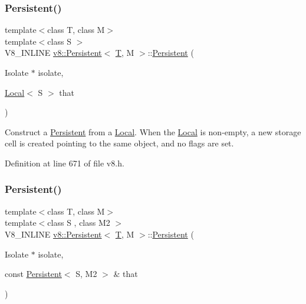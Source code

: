 \subsubsection{\texorpdfstring{Persistent()}{Persistent()}\hspace{0.1cm}{\footnotesize\ttfamily [2/4]}}
{\footnotesize\ttfamily template$<$class T, class M$>$ \\
template$<$class S $>$ \\
V8\+\_\+\+I\+N\+L\+I\+NE \mbox{\hyperlink{classv8_1_1Persistent}{v8\+::\+Persistent}}$<$ \mbox{\hyperlink{classv8_1_1internal_1_1torque_1_1T}{T}}, M $>$\+::\mbox{\hyperlink{classv8_1_1Persistent}{Persistent}} (\begin{DoxyParamCaption}\item[{Isolate $\ast$}]{isolate,  }\item[{\mbox{\hyperlink{classv8_1_1Local}{Local}}$<$ S $>$}]{that }\end{DoxyParamCaption})\hspace{0.3cm}{\ttfamily [inline]}}

Construct a \mbox{\hyperlink{classv8_1_1Persistent}{Persistent}} from a \mbox{\hyperlink{classv8_1_1Local}{Local}}. When the \mbox{\hyperlink{classv8_1_1Local}{Local}} is non-\/empty, a new storage cell is created pointing to the same object, and no flags are set. 

Definition at line 671 of file v8.\+h.

\mbox{\label{classv8_1_1Persistent_aaf9eb7c4e6d0ef2c81a2c08238653578}} 
\subsubsection{\texorpdfstring{Persistent()}{Persistent()}\hspace{0.1cm}{\footnotesize\ttfamily [3/4]}}
{\footnotesize\ttfamily template$<$class T, class M$>$ \\
template$<$class S , class M2 $>$ \\
V8\+\_\+\+I\+N\+L\+I\+NE \mbox{\hyperlink{classv8_1_1Persistent}{v8\+::\+Persistent}}$<$ \mbox{\hyperlink{classv8_1_1internal_1_1torque_1_1T}{T}}, M $>$\+::\mbox{\hyperlink{classv8_1_1Persistent}{Persistent}} (\begin{DoxyParamCaption}\item[{Isolate $\ast$}]{isolate,  }\item[{const \mbox{\hyperlink{classv8_1_1Persistent}{Persistent}}$<$ S, M2 $>$ \&}]{that }\end{DoxyParamCaption})\hspace{0.3cm}{\ttfamily [inline]}}

